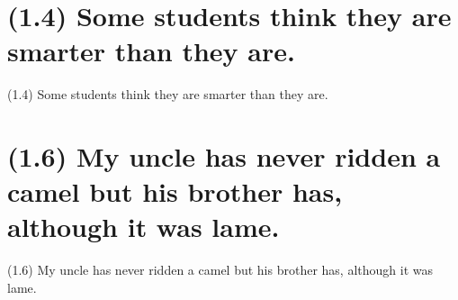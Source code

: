 \documentclass{article}
\begin{document}
\section*{(1.4) Some students think they are smarter than they are.}

\bigbreak
\begin{enumerate*}
\item[(1.4)] Some students think they are smarter than they are.
\end{enumerate*}
\bigbreak

\bigbreak
\begin{minipage}{\textwidth}
\end{minipage}
\bigbreak

\clearpage

%
%

\section*{(1.6) My uncle has never ridden a camel but his brother has, although it was lame.}

\bigbreak
\begin{enumerate*}
\item[(1.6)] My uncle has never ridden a camel but his brother has, although it was lame.
\end{enumerate*}
\bigbreak

\bigbreak
\begin{minipage}{\textwidth}
\end{minipage}
\bigbreak
\end{document}
